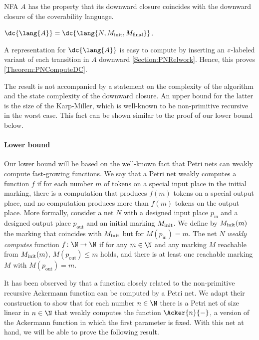 \documentclass[../../diss.tex]{subfiles}
\begin{document}
NFA $A$ has the property that its downward closure coincides with the downward closure of the coverability language.

\begin{lemma}%
    $\dc{\lang{A}} = \dc{\lang{N,\Minit,\Mfinal}}$.
\end{lemma}

A representation for $\dc{\lang{A}}$ is easy to compute by inserting an $\varepsilon$-labeled variant of each transition in $A$ downward \cref{Section:PNRelwork}.
Hence, this proves \cref{Theorem:PNComputeDC}.

The result is not accompanied by a statement on the complexity of the algorithm and the state complexity of the downward closure.
An upper bound for the latter is the size of the Karp-Miller, which is well-known to be non-primitive recursive in the worst case.
This fact can be shown similar to the proof of our lower bound below.

\paragraph{Lower bound}

Our lower bound will be based on the well-known fact that Petri nets can weakly compute fast-growing functions.
We say that a Petri net weakly computes a function $f$ if for each number $m$ of tokens on a special input place in the initial marking, there is a computation that produces $f(m)$ tokens on a special output place, and no computation produces more than $f(m)$ tokens on the output place.
More formally, consider a net $N$ with a designed input place $p_{\text{in}}$ and a designed output place $p_{\text{out}}$ and an initial marking $M_{\text{init}}$.
We define by $M_{\text{init}}(m)$ the marking that coincides with $M_{\text{init}}$ but for $M(p_{\text{in}}) = m$.
The net $N$ \emph{weakly computes} function $f \colon \N \to \N$ if for any $m \in \N$ and any marking $M$ reachable from $M_{\text{init}}(m)$, $M(p_{\text{out}}) \leq m$ holds, and there is at least one reachable marking $M$ with $M(p_{\text{out}}) = m$.

It has been observed by  that a function closely related to the non-primitive recursive Ackermann function can be computed by a Petri net.
We adapt their construction to show that for each number $n \in \N$ there is a Petri net of size linear in $n \in \N$ that weakly computes the function $\Acker{n}{-}$, \ie a version of the Ackermann function in which the first parameter is fixed.
With this net at hand, we will be able to prove the following result.
\end{document}
